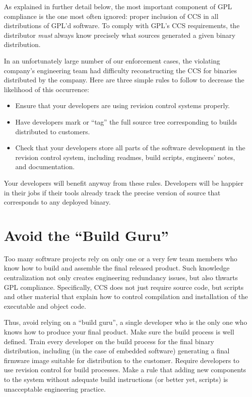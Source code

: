 As explained in further detail below, the most important component of GPL
compliance is the one most often ignored: proper inclusion of CCS in all
distributions  of GPL'd
software.  To comply with GPL's CCS requirements, the distributor
\textit{must} always know precisely what sources generated a given binary
distribution.

In an unfortunately large number of our enforcement cases, the violating
company's engineering team had difficulty reconstructing the CCS
for binaries distributed by the company.  Here are three simple rules to
follow to decrease the likelihood of this occurrence:

\begin{itemize}

\item Ensure that your
developers are using revision control systems properly.

\item Have developers mark or ``tag'' the full source tree corresponding to
  builds distributed to customers.

\item Check that your developers store all parts of the software
development in the revision control system, including {\sc readme}s, build
scripts, engineers' notes, and documentation.
\end{itemize}

Your developers will benefit anyway from these rules.  Developers will be
happier in their jobs if their tools already track the precise version of
source that corresponds to any deployed binary.

\section{Avoid the ``Build Guru''}

Too many software projects rely on only one or a very few team members who
know how to build and assemble the final released product.  Such knowledge
centralization not only creates engineering redundancy issues, but also
thwarts GPL compliance.  Specifically, CCS does not just require source code,
but scripts and other material that explain how to control compilation and
installation of the executable and object code.

Thus, avoid relying on a ``build guru'', a single developer who is the only one
who knows how to produce your final product. Make sure the build process
is well defined.  Train every developer on the build process for the final
binary distribution, including (in the case of embedded software)
generating a final firmware image suitable for distribution to the
customer.  Require developers to use revision control for build processes.
Make a rule that adding new components to the system without adequate
build instructions (or better yet, scripts) is unacceptable engineering
practice.

